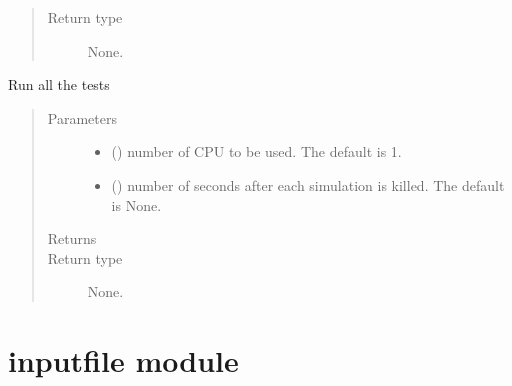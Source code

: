 \documentclass[letterpaper,10pt,english]{sphinxmanual}
\begin{document}
\begin{fulllineitems}
\begin{fulllineitems}
\begin{quote}
\begin{description}
\item[{Return type}] \leavevmode
None.

\end{description}\end{quote}

\end{fulllineitems}


\begin{fulllineitems}
\label{\detokenize{api/inputgeneration:testrun.MultipleTest.run}}
Run all the tests
\begin{quote}\begin{description}
\item[{Parameters}] \leavevmode\begin{itemize}
\item {} 
 (\sphinxstyleliteralemphasis{\sphinxupquote{, }}) \textendash{} number of CPU to be used. The default is 1.

\item {} 
 (\sphinxstyleliteralemphasis{\sphinxupquote{, }}) \textendash{} number of seconds after each simulation is killed. The default is
None.

\end{itemize}

\item[{Returns}] \leavevmode


\item[{Return type}] \leavevmode
None.

\end{description}\end{quote}

\end{fulllineitems}


\end{fulllineitems}



\section{inputfile module}
\label{\detokenize{api/inputgeneration:inputfile-module}}
\end{document}
